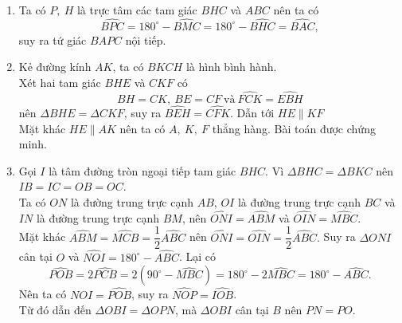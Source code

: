 \begin{ex}
{\begin{center}
\end{center}
\begin{enumerate}
\item Ta có $P,\ H$ là trực tâm các tam giác $BHC$ và $ABC$ nên ta có 
$$\widehat{BPC}=180^\circ-\widehat{BMC}=180^\circ-\widehat{BHC}=\widehat{BAC},$$
suy ra tứ giác $BAPC$ nội tiếp.
\item Kẻ đường kính $AK$, ta có $BKCH$ là hình bình hành.\\
Xét hai tam giác $BHE$ và $CKF$ có $$BH=CK,\ BE=CF\ \text{và}\ \widehat{FCK}=\widehat{EBH}$$ nên $\Delta BHE=\Delta CKF$, suy ra $\widehat{BEH}=\widehat{CFK}$. Dẫn tới $HE \parallel KF$\\
Mặt khác $HE \parallel AK $ nên ta có $A,\ K,\ F$ thẳng hàng. Bài toán được chứng minh.
\item Gọi $I$ là tâm đường tròn ngoại tiếp tam giác $BHC$. Vì  $\Delta BHC=\Delta BKC$ nên $IB=IC=OB=OC$.\\
Ta có $ON$ là đường trung trực cạnh $AB$, $OI$ là đường trung trực cạnh $BC$ và $IN$ là đường trung trực cạnh $BM$, nên $\widehat{ONI}=\widehat{ABM}$ và $\widehat{OIN}=\widehat{MBC}$. \\ Mặt khác $\widehat{ABM}=\widehat{MCB}=\dfrac{1}{2}\widehat{ABC}$ nên $\widehat{ONI}=\widehat{OIN}=\dfrac{1}{2}\widehat{ABC}.$ Suy ra $\Delta ONI$ cân tại $O$ và $\widehat{NOI}=180^\circ-\widehat{ABC} $. Lại có 
$$\widehat{POB}=2\widehat{PCB}=2(90^\circ-\widehat{MBC})=180^\circ-2\widehat{MBC}=180^\circ-\widehat{ABC}.$$
Nên ta có $\widehat{NOI}=\widehat{POB}$, suy ra $\widehat{NOP}=\widehat{IOB}$.\\
Từ đó dẫn đến $\Delta OBI=\Delta OPN$, mà $\Delta OBI$ cân tại $B$ nên $PN=PO$.

\end{enumerate}

}
\end{ex}


